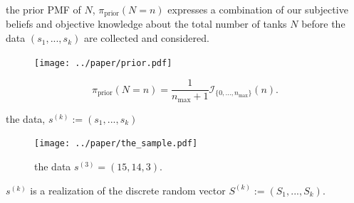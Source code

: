 \documentclass[10pt]{beamer}
\newcommand{\data}{$(s_1, ..., s_k)$\xspace}
\begin{document}
\begin{frame}[t]{the prior PMF of $N$, $\pi_{\text{prior}}(N=n)$}
expresses a combination of our subjective beliefs and objective knowledge about the total number of tanks $N$ before the data \data are collected and considered. 

\begin{figure}[h!]
	\centering
	\texttt{[image: ../paper/prior.pdf]}
\end{figure}

\begin{equation*}
	\pi_{\text{prior}}(N=n) = \dfrac{1}{n_{\max}+1} \mathcal{I}_{ \{0, ..., n_{\text{max}}\}}(n).	 
\end{equation*}
\end{frame}

\begin{frame}[t]{the data, $s^{(k)}:=(s_1,...,s_k)$}
\begin{figure}
	\centering
	\texttt{[image: ../paper/the\_sample.pdf]}
	\caption{the data $s^{(3)}=(15, 14, 3)$.}
\end{figure}

 $s^{(k)}$ is a realization of the discrete random vector $S^{(k)}:=(S_1, ..., S_k)$. 


\end{frame}
\end{document}
